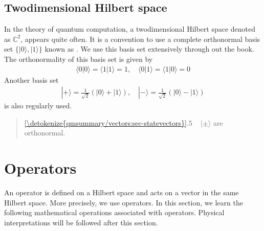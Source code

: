 \documentclass[letterpaper,10pt,english]{jupyterBook}
\begin{document}
\subsection{Two\sphinxhyphen{}dimensional Hilbert space}
\label{\detokenize{qmsummary/vectors:two-dimensional-hilbert-space}}
\sphinxAtStartPar
In the theory of quantum computation, a two\sphinxhyphen{}dimensional Hilbert space denoted as \(\mathbb{C}^2\), appears quite often.  It is a convention to use a complete orthonormal basis set \(\{|0\rangle, |1\rangle\}\) known as .  We use this basis set extensively through out the book.  The orthonormality of this basis set is given by
\begin{equation}\label{equation:qmsummary/vectors:eq-comp-basis}
\begin{split}
\langle 0|0 \rangle = \langle 1|1 \rangle = 1, \quad \langle 0|1 \rangle = \langle 1|0 \rangle = 0
\end{split}
\end{equation}
\sphinxAtStartPar
Another basis set
\begin{equation}\label{equation:qmsummary/vectors:eq-plusminus-basis}
\begin{split}
|+\rangle = \frac{1}{\sqrt{2}} \left( |0\rangle + |1\rangle\right), \quad |-\rangle = \frac{1}{\sqrt{2}} \left( |0\rangle - |1\rangle\right)
\end{split}
\end{equation}
\sphinxAtStartPar
is also regularly used.
\begin{quote}

\sphinxAtStartPar
{} \hyperref[\detokenize{qmsummary/vectors:sec-statevectors}]{\ref{\detokenize{qmsummary/vectors:sec-statevectors}}}.5    \(|\pm\rangle\) are orthonormal.
\end{quote}

\sphinxstepscope


\section{Operators}
\label{\detokenize{qmsummary/operators:operators}}\label{\detokenize{qmsummary/operators:sec-operators}}\label{\detokenize{qmsummary/operators::doc}}
\sphinxAtStartPar
An operator is defined on a Hilbert space and acts on a vector in the same Hilbert space.  More precisely, we use  operators.  In this section, we learn the following mathematical operations associated with operators.  Physical interpretations will be followed after this section.
\end{document}
